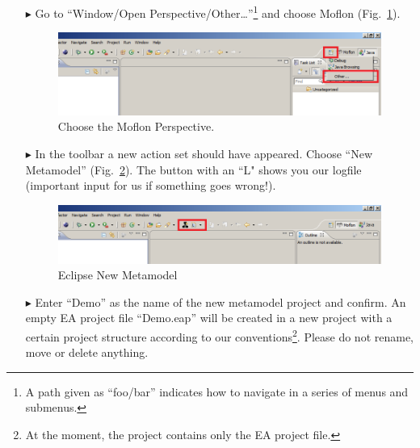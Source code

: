 \begin{enumerate}
\item[$\blacktriangleright$] Go to ``Window/Open Perspective/Other\ldots''\footnote{A path given as ``foo/bar'' indicates how to navigate in a series of menus and submenus.} and choose Moflon (Fig.~\ref{fig_eclipse}). 
\begin{figure}[htbp]
	\centering
  \includegraphics[width=\textwidth]{pics/installationAndSetup/eclipse_firststart.png}
	\caption{Choose the Moflon Perspective.}
	\label{fig_eclipse}
\end{figure}

\item[$\blacktriangleright$] In the toolbar a new action set should have appeared. Choose ``New Metamodel'' (Fig.~\ref{fig_eclipseNewMetamodel}).
The button with an ``L" shows you our logfile (important input for us if something goes wrong!).
\begin{figure}[htbp]
	\centering
  \includegraphics[width=\textwidth]{pics/installationAndSetup/eclipse_metamodelButton.png}
	\caption{Eclipse New Metamodel}
	\label{fig_eclipseNewMetamodel}
\end{figure}

\item[$\blacktriangleright$] Enter ``Demo'' as the name of the new metamodel project and confirm. 
An empty EA project file ``Demo.eap'' will be created in a new project with a certain project structure according to our conventions\footnote{At the moment, the project contains only the EA project file.}.
Please do not rename, move or delete anything.


\end{enumerate}
